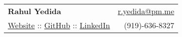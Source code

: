 \documentclass[letterpaper,11pt]{article}
\newif \ifml
\newcommand{\role}{}
\newif\ifroleset
\renewcommand{\role}{Web Developer}
\renewcommand{\role}{ML Engineer}
\renewcommand{\role}{iOS Developer}
\renewcommand{\role}{Desktop Developer}
\renewcommand{\role}{Software Developer}
\renewcommand{\role}{}
\begin{document}
\thispagestyle{empty}  %

\begin{tabular*}{\textwidth}{l@{\extracolsep{\fill}}r}
  \textbf{\Large Rahul Yedida}\ifroleset,\fi \role &  \url{r.yedida@pm.me}\\
  \href{https://ryedida.me}{Website}  :: \href{https://github.com/yrahul3910}{GitHub}  :: \href{https://linkedin.com/in/rahul-yedida}{LinkedIn} & (919)-636-8327 \\
\end{tabular*}




\ifml

\fi



\ifml


\fi

\end{document}
